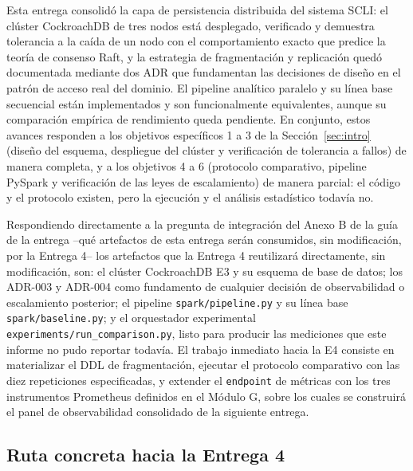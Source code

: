 \documentclass[10pt,twocolumn]{article}
\begin{document}
Esta entrega consolidó la capa de persistencia distribuida del sistema
SCLI: el clúster CockroachDB de tres nodos está desplegado, verificado y
demuestra tolerancia a la caída de un nodo con el comportamiento exacto que
predice la teoría de consenso Raft, y la estrategia de fragmentación y
replicación quedó documentada mediante dos ADR que fundamentan las
decisiones de diseño en el patrón de acceso real del dominio. El pipeline
analítico paralelo y su línea base secuencial están implementados y son
funcionalmente equivalentes, aunque su comparación empírica de rendimiento
queda pendiente. En conjunto, estos avances responden a los objetivos
específicos 1 a 3 de la Sección~\ref{sec:intro} (diseño del esquema,
despliegue del clúster y verificación de tolerancia a fallos) de manera
completa, y a los objetivos 4 a 6 (protocolo comparativo, pipeline PySpark
y verificación de las leyes de escalamiento) de manera parcial: el código
y el protocolo existen, pero la ejecución y el análisis estadístico
todavía no.

Respondiendo directamente a la pregunta de integración del Anexo B de la
guía de la entrega --qué artefactos de esta entrega serán consumidos, sin
modificación, por la Entrega 4-- los artefactos que la Entrega 4
reutilizará directamente, sin modificación, son: el clúster CockroachDB E3
y su esquema de base de datos;
los ADR-003 y ADR-004 como fundamento de cualquier decisión de observabilidad
o escalamiento posterior; el pipeline \texttt{spark/pipeline.py} y su línea
base \texttt{spark/baseline.py}; y el orquestador experimental
\texttt{experiments/run\_comparison.py}, listo para producir las mediciones
que este informe no pudo reportar todavía. El trabajo inmediato hacia la
E4 consiste en materializar el DDL de fragmentación, ejecutar el protocolo
comparativo con las diez repeticiones especificadas, y extender el
\texttt{endpoint} de métricas con los tres instrumentos Prometheus
definidos en el Módulo G, sobre los cuales se construirá el panel de
observabilidad consolidado de la siguiente entrega.

\subsection{Ruta concreta hacia la Entrega 4}
\end{document}
